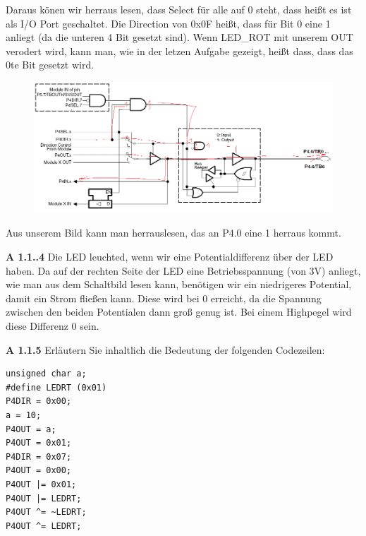 \documentclass[a4paper,ngerman]{article}
\begin{document}
\begin{description}
Daraus könen wir herraus lesen, dass Select für alle auf 0 steht, dass heißt es ist als I/O Port geschaltet. Die Direction von 0x0F heißt, dass für Bit 0 eine 1 anliegt (da die unteren 4 Bit gesetzt sind). Wenn LED\_ROT mit unserem OUT verodert wird, kann man, wie in der letzen Aufgabe gezeigt, heißt dass, dass das 0te Bit gesetzt wird.\\

\begin{figure}[h!]
	\includegraphics[scale=0.6]{1_3.png}
\end{figure}

Aus unserem Bild kann man herrauslesen, das an P4.0 eine 1 herraus kommt.

\item{\bfseries A 1.1..4} Die LED leuchted, wenn wir eine Potentialdifferenz über der LED haben. Da auf der rechten Seite der LED eine Betriebsspannung (von 3V) anliegt, wie man aus dem Schaltbild lesen kann, benötigen wir ein niedrigeres Potential, damit ein Strom fließen kann. Diese wird bei 0 erreicht, da die Spannung zwischen den beiden Potentialen dann groß genug ist. Bei einem Highpegel wird diese Differenz 0 sein.

\pagebreak

\item{\bfseries A 1.1.5} Erläutern Sie inhaltlich die Bedeutung der folgenden Codezeilen:

\begin{lstlisting}
unsigned char a;
#define LEDRT (0x01)
P4DIR = 0x00;
a = 10;
P4OUT = a;
P4OUT = 0x01;
P4DIR = 0x07;
P4OUT = 0x00;
P4OUT |= 0x01;
P4OUT |= LEDRT;
P4OUT ^= ~LEDRT;
P4OUT ^= LEDRT;
\end{lstlisting}


\end{description}
\end{document}
